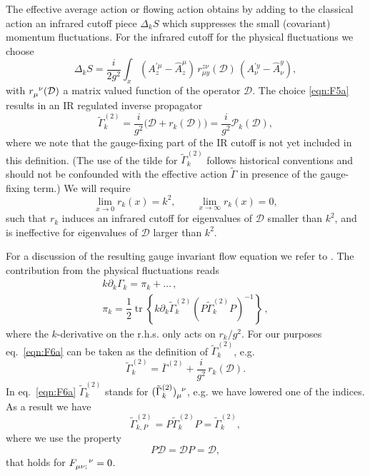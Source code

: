 \documentclass[twocolumn,aps,prd,amsmath,amssymb,preprintnumbers,longbibliography]{revtex4-1}
\numberwithin{equation}{section}
\DeclareMathOperator{\tr}{tr}
\begin{document}
The effective average action or flowing action obtains by adding to the classical action an infrared cutoff piece $\Delta_{k}S$ which suppresses the small (covariant) momentum fluctuations. For the infrared cutoff for the physical fluctuations we choose
\begin{equation}\label{eqn:F5a}
	\Delta_k S
	= \frac{i}{2 g^2} \int_x (A_z^{\prime\mu} - \hat{A}_z^\mu) \, r_{\mu y}^{z \nu}(\mathcal{D}) \, (A_\nu^{\prime y} - \hat{A}_\nu^y),
\end{equation}
with $\tensor{r}{_\mu^\nu}(\mathcal{D})$ a matrix valued function of the operator $\mathcal{D}$. The choice \eqref{eqn:F5a} results in an IR regulated inverse propagator
\begin{equation}\label{eqn:F6a}
	\tilde\Gamma^{(2)}_k
	= \frac{i}{g^2}\bigl(\mathcal{D} + r_k(\mathcal{D})\bigr)
	= \frac{i}{g^2}
	\mathcal{P}_k(\mathcal{D}),
\end{equation}
where we note that the gauge-fixing part of the IR cutoff is not yet included in this definition. (The use of the tilde for $\tilde{\Gamma}_{k}^{(2)}$ follows historical conventions and should not be confounded with the effective action $\tilde\Gamma$ in presence of the gauge-fixing term.) We will require
\begin{equation}\label{eqn:F7a}
	\lim_{x\to 0} r_k(x)
	= k^2,
	\qquad
	\lim_{x\to \infty} r_k(x)
	= 0,
\end{equation}
such that $r_k$ induces an infrared cutoff for eigenvalues of $\mathcal{D}$ smaller than $k^2$, and is ineffective for eigenvalues of $\mathcal{D}$ larger than $k^2$.

For a discussion of the resulting gauge invariant flow equation we refer to \cite{CWGIF}. The contribution from the physical fluctuations reads
\begin{align}\label{eq:AS:145AA} 
k\partial_{k}\Gamma_{k}=\pi_{k}+\ldots\, ,\\
\pi_{k}=\dfrac{1}{2}\tr\left \{k\partial_{k}\tilde{\Gamma}_{k}^{(2)}(P\tilde{\Gamma}_{k}^{(2)}P)^{-1}\right \}\, ,
\end{align}
where the $k$-derivative on the r.h.s. only acts on $r_{k}/g^{2}$. For our purposes eq.~\eqref{eqn:F6a} can be taken as the definition of $\tilde\Gamma^{(2)}_k$, e.g.
\begin{equation}
	\tilde\Gamma^{(2)}_k
	= \bar\Gamma^{(2)} + \frac{i}{g^2} \, r_k(\mathcal{D}).
\end{equation}
In eq.~\eqref{eqn:F6a} $\tilde \Gamma^{(2)}_k$ stands for $\tensor{(\tilde\Gamma^{(2)}_k)}{_\mu^\nu}$, e.g. we have lowered one of the indices. As a result we have
\begin{equation}\label{eqn:F8a}
	\tilde\Gamma^{(2)}_{k,P}
	= P \tilde\Gamma^{(2)}_k P
	= \tilde\Gamma^{(2)}_k,
\end{equation}
where we use the property
\begin{equation}\label{eqn:F9a}
	P \mathcal{D}
	= \mathcal{D} P
	= \mathcal{D},
\end{equation}
that holds for $\tensor{F}{_\mu_\nu_;^\nu} = 0$.
\end{document}
